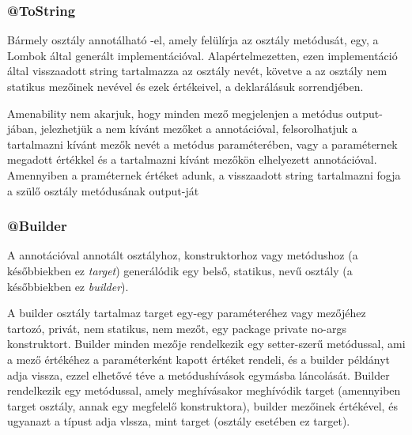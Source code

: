 
\subsubsection{@ToString}

Bármely osztály annotálható -el, amely felülírja az osztály  metódusát, egy, a Lombok által generált implementációval. Alapértelmezetten, ezen implementáció által visszaadott string tartalmazza az osztály nevét, követve a az osztály nem statikus mezőinek nevével és ezek értékeivel, a deklarálásuk sorrendjében. \par

Amenability nem akarjuk, hogy minden mező megjelenjen a metódus output-jában, jelezhetjük a nem kívánt mezőket a  annotációval, felsorolhatjuk a tartalmazni kívánt mezők nevét a  metódus  paraméterében, vagy a  paraméternek megadott  értékkel és a tartalmazni kívánt mezőkön elhelyezett  annotációval. Amennyiben a  praméternek  értéket adunk, a visszaadott string tartalmazni fogja a szülő osztály  metódusának output-ját \par

\subsubsection{@Builder}

A  annotációval annotált  osztályhoz, konstruktorhoz vagy metódushoz (a későbbiekben ez \emph{target}) generálódik egy belső, statikus,  nevű osztály (a későbbiekben ez \emph{builder}). \par

A builder osztály tartalmaz target egy-egy paraméteréhez vagy mezőjéhez tartozó, privát, nem statikus, nem  mezőt, egy package private no-args konstruktort. Builder minden mezője rendelkezik egy setter-szerű metódussal, ami a mező értékéhez a paraméterként kapott értéket rendeli, és a builder példányt adja vissza, ezzel elhetővé téve a metódushívások egymásba láncolását. Builder rendelkezik egy  metódussal, amely meghívásakor meghívódik target (amennyiben target osztály, annak egy megfelelő konstruktora), builder mezőinek értékével, és ugyanazt a típust adja vlssza, mint target (osztály esetében ez target). \par

